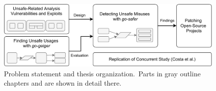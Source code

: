 \begin{figure}[htp!]
    \includegraphics[width=\textwidth]{assets/figures/chapter1/outline1.pdf}
    \caption[Problem statement and thesis organization]
    {Problem statement and thesis organization.\newline\footnotesize~Parts in gray outline chapters and are shown in detail there.}
    \label{fig:outline1}
\end{figure}
